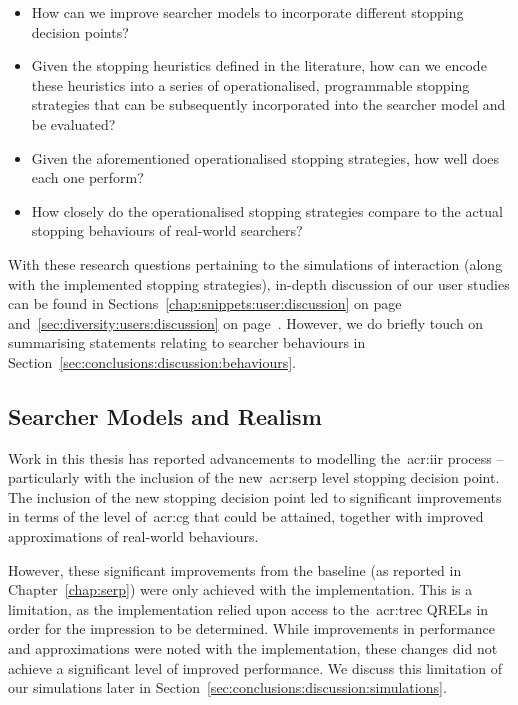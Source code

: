 \begin{itemize}
    \item{ How can we improve searcher models to incorporate different stopping decision points?}
    \item{ Given the stopping heuristics defined in the literature, how can we encode these heuristics into a series of operationalised, programmable stopping strategies that can be subsequently incorporated into the searcher model and be evaluated?}
    \item{ Given the aforementioned operationalised stopping strategies, how well does each one perform?}
    \item{ How closely do the operationalised stopping strategies compare to the actual stopping behaviours of real-world searchers?}
\end{itemize}

With these research questions pertaining to the simulations of interaction (along with the implemented stopping strategies), in-depth discussion of our user studies can be found in Sections~\ref{chap:snippets:user:discussion} on page~\pageref{chap:snippets:user:discussion} and~\ref{sec:diversity:users:discussion} on page~\pageref{sec:diversity:users:discussion}. However, we do briefly touch on summarising statements relating to searcher behaviours in Section~\ref{sec:conclusions:discussion:behaviours}.

\subsection{Searcher Models and Realism}\label{sec:conclusions:discussion:realism}
Work in this thesis has reported advancements to modelling the~\gls{acr:iir} process -- particularly with the inclusion of the new~\gls{acr:serp} level stopping decision point. The inclusion of the new stopping decision point led to significant improvements in terms of the level of~\gls{acr:cg} that could be attained, together with improved approximations of real-world behaviours.

However, these significant improvements from the  baseline (as reported in Chapter~\ref{chap:serp}) were only achieved with the  implementation. This is a limitation, as the implementation relied upon access to the~\gls{acr:trec} QRELs in order for the impression to be determined. While improvements in performance and approximations were noted with the  implementation, these changes did not achieve a significant level of improved performance. We discuss this limitation of our simulations later in Section~\ref{sec:conclusions:discussion:simulations}.

